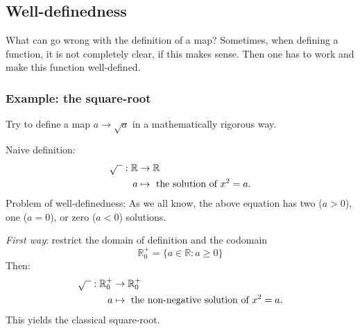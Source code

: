 \subsection*{Well-definedness}
What can go wrong with the definition of a map? 
Sometimes, when defining a function, it is not completely clear, if this makes sense. 
Then one has to work and make this function well-defined. 

\subsubsection{Example: the square-root}

Try to define a map $a \to \sqrt{a}$ in a mathematically rigorous way.

Naive definition:
\begin{align*}
 \sqrt{\hphantom{x}} : \mathbb{R} &\to \mathbb{R}\\
         a &\mapsto \mbox{ the solution of } x^2=a.
\end{align*}
Problem of well-definedness: As we all know, the above equation has two ($a>0$), one ($a=0$), or zero ($a<0$) solutions.

\white{2cm}{}

\emph{First way}: restrict the domain of definition and the codomain
\[
 \mathbb{R}^+_0 =  \{ a \in \mathbb{R}: a \ge 0 \}
\]
Then:
\begin{align*}
 \sqrt{\hphantom{x}} : \mathbb{R}^+_0 &\to \mathbb{R}^+_0\\
         a &\mapsto  \mbox{ the non-negative solution of } x^2=a.
\end{align*}
This yields the classical square-root. 




